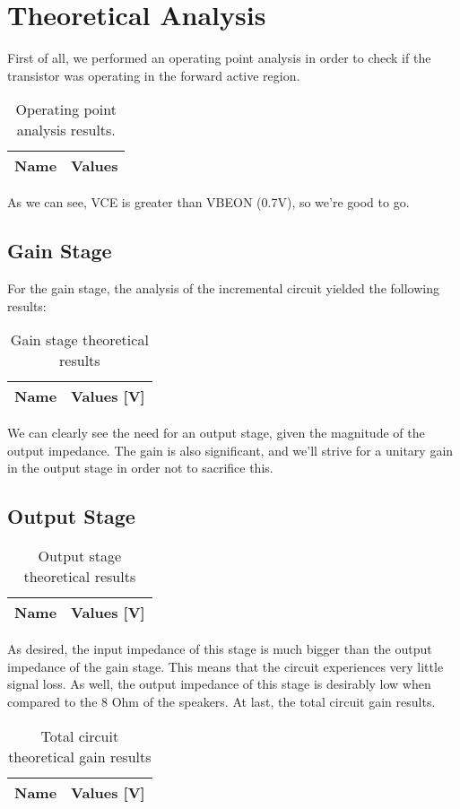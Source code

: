 \section{Theoretical Analysis}
\label{sec:analysis}
First of all, we performed an operating point analysis in order to check if the transistor was operating in the forward active region.
\begin{table}[h!]
  \centering
  \begin{tabular}{|l|r|}
    \hline    
    {\bf Name} & {\bf Values} \\ \hline
     
  \end{tabular}
  \caption{Operating point analysis results.}
  \label{tab:data}
\end{table}

As we can see, VCE is greater than VBEON (0.7V), so we're good to go.
\subsection{Gain Stage}
For the gain stage, the analysis of the incremental circuit yielded the following results:
\begin{table}[h]
  \centering
  \begin{tabular}{|l|r|}
    \hline    
    {\bf Name} & {\bf Values [V]} \\ \hline
     
  \end{tabular}
  \caption{Gain stage theoretical results}
  \label{tab:gain}
\end{table}

We can clearly see the need for an output stage, given the magnitude of the output impedance. The gain is also significant, and we'll strive for a unitary gain in the output stage in order not to sacrifice this.
\subsection{Output Stage}
\begin{table}[h]
  \centering
  \begin{tabular}{|l|r|}
    \hline    
    {\bf Name} & {\bf Values [V]} \\ \hline
     
  \end{tabular}
  \caption{Output stage theoretical results}
  \label{tab:output}
\end{table}
As desired, the input impedance of this stage is much bigger than the output impedance of the gain stage. This means that the circuit experiences very little signal loss. As well, the output impedance of this stage is desirably low when compared to the 8 Ohm of the speakers.
At last, the total circuit gain results.
\begin{table}[h]
  \centering
  \begin{tabular}{|l|r|}
    \hline    
    {\bf Name} & {\bf Values [V]} \\ \hline
     
  \end{tabular}
  \caption{Total circuit theoretical gain results}
  \label{tab:output}
\end{table}

